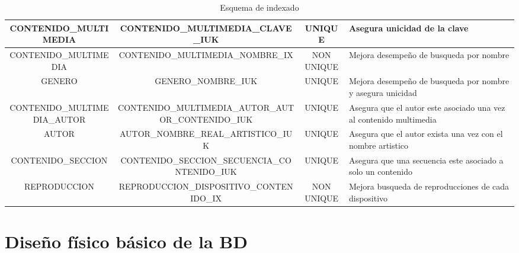 \documentclass[journal]{IEEEtran}
\begin{document}
\begin{table}[H]
\begin{longtable}{| c | c | c | L{2.5cm} |}
   \hline
   CONTENIDO\_MULTIMEDIA & CONTENIDO\_MULTIMEDIA\_CLAVE\_IUK & UNIQUE & Asegura unicidad de la clave \\
   \hline
   CONTENIDO\_MULTIMEDIA & CONTENIDO\_MULTIMEDIA\_NOMBRE\_IX & NON UNIQUE & Mejora desempeño de busqueda por nombre \\
   \hline
   GENERO & GENERO\_NOMBRE\_IUK & UNIQUE & Mejora desempeño de busqueda por nombre y asegura unicidad \\
   \hline
   CONTENIDO\_MULTIMEDIA\_AUTOR & CONTENIDO\_MULTIMEDIA\_AUTOR\_AUTOR\_CONTENIDO\_IUK & UNIQUE & Asegura que el autor este asociado una vez al contenido multimedia \\
   \hline
   AUTOR & AUTOR\_NOMBRE\_REAL\_ARTISTICO\_IUK & UNIQUE & Asegura que el autor exista una vez con el nombre artistico \\
   \hline
   CONTENIDO\_SECCION & CONTENIDO\_SECCION\_SECUENCIA\_CONTENIDO\_IUK & UNIQUE & Asegura que una secuencia este asociado a solo un contenido \\
   \hline
   REPRODUCCION & REPRODUCCION\_DISPOSITIVO\_CONTENIDO\_IX & NON UNIQUE & Mejora busqueda de reproducciones de cada dispositivo \\ [1ex] 
   \hline
  \end{longtable}
  \caption{Esquema de indexado}
  \label{tabla:5}
\end{table}
\section{Diseño físico básico de la BD}
\end{document}
